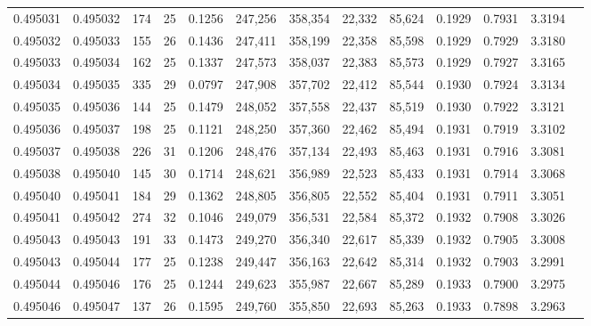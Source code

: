\begin{tabular}{rrrrrrrrrrrrr}
0.495031 & 0.495032 & 174 &  25 &                                     0.1256 & 247,256 & 358,354 &  22,332 &  85,624 & 0.1929 & 0.7931 & 3.3194 \\
0.495032 & 0.495033 & 155 &  26 &                                     0.1436 & 247,411 & 358,199 &  22,358 &  85,598 & 0.1929 & 0.7929 & 3.3180 \\
0.495033 & 0.495034 & 162 &  25 &                                     0.1337 & 247,573 & 358,037 &  22,383 &  85,573 & 0.1929 & 0.7927 & 3.3165 \\
0.495034 & 0.495035 & 335 &  29 &                                     0.0797 & 247,908 & 357,702 &  22,412 &  85,544 & 0.1930 & 0.7924 & 3.3134 \\
0.495035 & 0.495036 & 144 &  25 &                                     0.1479 & 248,052 & 357,558 &  22,437 &  85,519 & 0.1930 & 0.7922 & 3.3121 \\
0.495036 & 0.495037 & 198 &  25 &                                     0.1121 & 248,250 & 357,360 &  22,462 &  85,494 & 0.1931 & 0.7919 & 3.3102 \\
0.495037 & 0.495038 & 226 &  31 &                                     0.1206 & 248,476 & 357,134 &  22,493 &  85,463 & 0.1931 & 0.7916 & 3.3081 \\
0.495038 & 0.495040 & 145 &  30 &                                     0.1714 & 248,621 & 356,989 &  22,523 &  85,433 & 0.1931 & 0.7914 & 3.3068 \\
0.495040 & 0.495041 & 184 &  29 &                                     0.1362 & 248,805 & 356,805 &  22,552 &  85,404 & 0.1931 & 0.7911 & 3.3051 \\
0.495041 & 0.495042 & 274 &  32 &                                     0.1046 & 249,079 & 356,531 &  22,584 &  85,372 & 0.1932 & 0.7908 & 3.3026 \\
0.495043 & 0.495043 & 191 &  33 &                                     0.1473 & 249,270 & 356,340 &  22,617 &  85,339 & 0.1932 & 0.7905 & 3.3008 \\
0.495043 & 0.495044 & 177 &  25 &                                     0.1238 & 249,447 & 356,163 &  22,642 &  85,314 & 0.1932 & 0.7903 & 3.2991 \\
0.495044 & 0.495046 & 176 &  25 &                                     0.1244 & 249,623 & 355,987 &  22,667 &  85,289 & 0.1933 & 0.7900 & 3.2975 \\
0.495046 & 0.495047 & 137 &  26 &                                     0.1595 & 249,760 & 355,850 &  22,693 &  85,263 & 0.1933 & 0.7898 & 3.2963 \\

\end{tabular}
